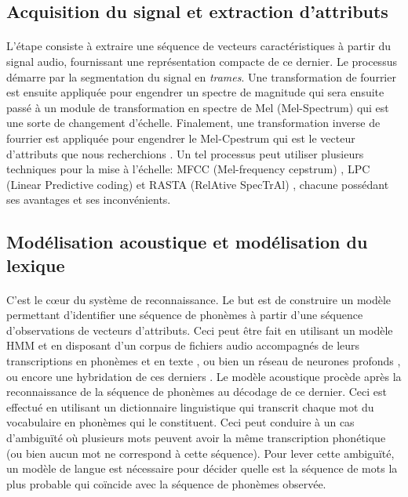 \subsection{Acquisition du signal et extraction d'attributs}
\paragraph{}
L'étape consiste à extraire une séquence de vecteurs caractéristiques à partir du signal audio, fournissant une représentation compacte de ce dernier. Le processus démarre par la segmentation du signal en \textit{trames}. Une transformation de fourrier est ensuite appliquée pour engendrer un spectre de magnitude qui sera ensuite passé à un module de transformation en spectre de Mel (Mel-Spectrum) qui est une sorte de changement d'échelle. Finalement, une transformation inverse de fourrier est appliquée pour engendrer le Mel-Cpestrum qui est le vecteur d'attributs que nous recherchions \citep{asr_extraction}. Un tel processus peut utiliser plusieurs techniques pour la mise à l'échelle: MFCC (Mel-frequency cepstrum) \citep{MFCC}, LPC (Linear Predictive coding) \citep{LSP} et RASTA (RelAtive SpecTrAl) \citep{RASTA}, chacune possédant ses avantages et ses inconvénients.
\subsection{Modélisation acoustique et modélisation du lexique}
\paragraph{}
C'est le c\oe{}ur du système de reconnaissance. Le but est de construire un modèle permettant d'identifier une séquence de phonèmes à partir d'une séquence d'observations de vecteurs d'attributs. Ceci peut être fait en utilisant un modèle HMM et en disposant d'un corpus de fichiers audio accompagnés de leurs transcriptions en phonèmes et en texte \citep{hmm_acoustic_model,hmm_formal}, ou bien un réseau de neurones profonds \citep{speech_reco_Yu2015}, ou encore une hybridation de ces derniers \citep{dnn-hmm_acoustic_model}. Le modèle acoustique procède après la reconnaissance de la séquence de phonèmes au décodage de ce dernier. Ceci est effectué en utilisant un dictionnaire linguistique qui transcrit chaque mot du vocabulaire en phonèmes qui le constituent. Ceci peut conduire à un cas d'ambiguïté où plusieurs mots peuvent avoir la même transcription phonétique (ou bien aucun mot ne correspond à cette séquence). Pour lever cette ambiguïté, un modèle de langue est nécessaire pour décider quelle est la séquence de mots la plus probable qui coïncide avec la séquence de phonèmes observée.  
